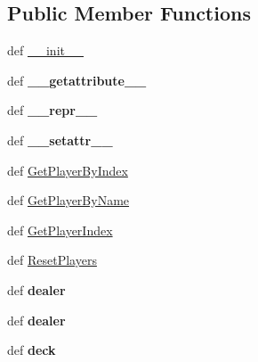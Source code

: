 \subsection*{Public Member Functions}
\begin{DoxyCompactItemize}
\item 
def \hyperlink{classcards-with-friends_1_1game_1_1_game_a11c7ae2e00ff8af5a510ebfc14d43635}{\-\_\-\-\_\-init\-\_\-\-\_\-}
\item 
\hypertarget{classcards-with-friends_1_1game_1_1_game_ab364e816fad8ae7537af4339ca2ef593}{def {\bfseries \-\_\-\-\_\-getattribute\-\_\-\-\_\-}}\label{classcards-with-friends_1_1game_1_1_game_ab364e816fad8ae7537af4339ca2ef593}

\item 
\hypertarget{classcards-with-friends_1_1game_1_1_game_ab93a7b3660cdb7e2383206610bc6a6a3}{def {\bfseries \-\_\-\-\_\-repr\-\_\-\-\_\-}}\label{classcards-with-friends_1_1game_1_1_game_ab93a7b3660cdb7e2383206610bc6a6a3}

\item 
\hypertarget{classcards-with-friends_1_1game_1_1_game_a06719d07da4776303f5dd7b50ca4bb22}{def {\bfseries \-\_\-\-\_\-setattr\-\_\-\-\_\-}}\label{classcards-with-friends_1_1game_1_1_game_a06719d07da4776303f5dd7b50ca4bb22}

\item 
def \hyperlink{classcards-with-friends_1_1game_1_1_game_a44a3fcdf59ea4be488aac3db7a01a91d}{Get\-Player\-By\-Index}
\item 
def \hyperlink{classcards-with-friends_1_1game_1_1_game_a5df2b7942c2b2707cd766dd340e5e513}{Get\-Player\-By\-Name}
\item 
def \hyperlink{classcards-with-friends_1_1game_1_1_game_acf2a8ec5e9625ecc732a25c4855d2934}{Get\-Player\-Index}
\item 
def \hyperlink{classcards-with-friends_1_1game_1_1_game_a65be6ddba2240807dca1edc0ef7974d2}{Reset\-Players}
\item 
\hypertarget{classcards-with-friends_1_1game_1_1_game_a6259d61238d30de3629e369c835a0bba}{def {\bfseries dealer}}\label{classcards-with-friends_1_1game_1_1_game_a6259d61238d30de3629e369c835a0bba}

\item 
\hypertarget{classcards-with-friends_1_1game_1_1_game_a6259d61238d30de3629e369c835a0bba}{def {\bfseries dealer}}\label{classcards-with-friends_1_1game_1_1_game_a6259d61238d30de3629e369c835a0bba}

\item 
\hypertarget{classcards-with-friends_1_1game_1_1_game_ab49a2d8d555152ad6b3bd70f269457d7}{def {\bfseries deck}}\label{classcards-with-friends_1_1game_1_1_game_ab49a2d8d555152ad6b3bd70f269457d7}


\end{DoxyCompactItemize}
